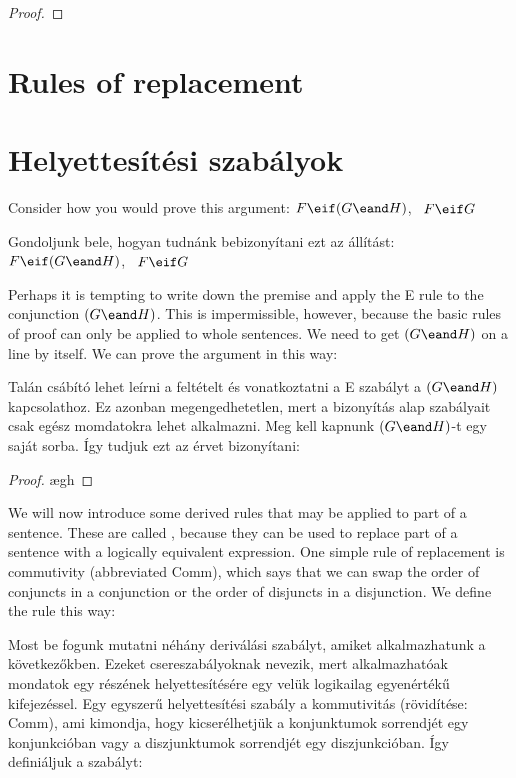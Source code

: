 \begin{proof}
\end{proof}


\section*{Rules of replacement}
\section{Helyettesítési szabályok}
Consider how you would prove this argument: $F\eif(G\eand H)$, \therefore\ $F\eif G$

Gondoljunk bele, hogyan tudnánk bebizonyítani ezt az állítást: $F\eif(G\eand H)$, \therefore\ $F\eif G$

Perhaps it is tempting to write down the premise and apply the {\eand}E rule to the conjunction $(G \eand H)$. This is impermissible, however, because the basic rules of proof can only be applied to whole sentences. We need to get $(G \eand H)$ on a line by itself. We can prove the argument in this way:

Talán csábító lehet leírni a feltételt és vonatkoztatni a {\eand}E szabályt a $(G \eand H)$ kapcsolathoz. Ez azonban megengedhetetlen, mert a bizonyítás alap szabályait csak egész momdatokra lehet alkalmazni. Meg kell kapnunk $(G \eand H)$-t egy saját sorba. Így tudjuk ezt az érvet bizonyítani:



\begin{proof}
	\open
		\ae{gh}
	\close
\end{proof}

We will now introduce some derived rules that may be applied to part of a sentence. These are called , because they can be used to replace part of a sentence with a logically equivalent expression. One simple rule of replacement is commutivity (abbreviated Comm), which says that we can swap the order of conjuncts in a conjunction or the order of disjuncts in a disjunction. We define the rule this way:

Most be fogunk mutatni néhány deriválási szabályt, amiket alkalmazhatunk a következőkben. Ezeket csereszabályoknak nevezik, mert alkalmazhatóak mondatok egy részének helyettesítésére egy velük logikailag egyenértékű kifejezéssel. Egy egyszerű helyettesítési szabály a kommutivitás (rövidítése: Comm), ami kimondja, hogy kicserélhetjük a konjunktumok sorrendjét egy konjunkcióban vagy a diszjunktumok sorrendjét egy diszjunkcióban.  Így definiáljuk a szabályt:

